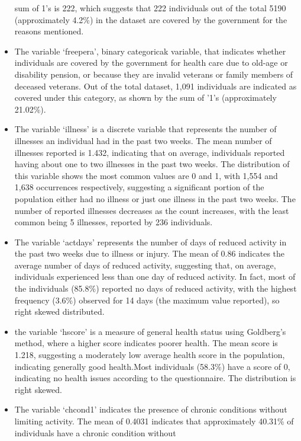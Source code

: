 \documentclass[
]{article}
\begin{document}
\begin{itemize}
  sum of 1's is 222, which suggests that 222 individuals out of the
  total 5190 (approximately 4.2\%) in the dataset are covered by the
  government for the reasons mentioned.
\item
  The variable `freepera', binary categoricak variable, that indicates
  whether individuals are covered by the government for health care due
  to old-age or disability pension, or because they are invalid veterans
  or family members of deceased veterans. Out of the total dataset,
  1,091 individuals are indicated as covered under this category, as
  shown by the sum of '1's (approximately 21.02\%).
\item
  The variable `illness' is a discrete variable that represents the
  number of illnesses an individual had in the past two weeks. The mean
  number of illnesses reported is 1.432, indicating that on average,
  individuals reported having about one to two illnesses in the past two
  weeks. The distribution of this variable shows the most common values
  are 0 and 1, with 1,554 and 1,638 occurrences respectively, suggesting
  a significant portion of the population either had no illness or just
  one illness in the past two weeks. The number of reported illnesses
  decreases as the count increases, with the least common being 5
  illnesses, reported by 236 individuals.
\item
  The variable `actdays' represents the number of days of reduced
  activity in the past two weeks due to illness or injury. The mean of
  0.86 indicates the average number of days of reduced activity,
  suggesting that, on average, individuals experienced less than one day
  of reduced activity. In fact, most of the individuals (85.8\%)
  reported no days of reduced activity, with the highest frequency
  (3.6\%) observed for 14 days (the maximum value reported), so right
  skewed distributed.
\item
  the variable `hscore' is a measure of general health status using
  Goldberg's method, where a higher score indicates poorer health. The
  mean score is 1.218, suggesting a moderately low average health score
  in the population, indicating generally good health.Most individuals
  (58.3\%) have a score of 0, indicating no health issues according to
  the questionnaire. The distribution is right skewed.
\item
  The variable `chcond1' indicates the presence of chronic conditions
  without limiting activity. The mean of 0.4031 indicates that
  approximately 40.31\% of individuals have a chronic condition without

\end{itemize}
\end{document}
